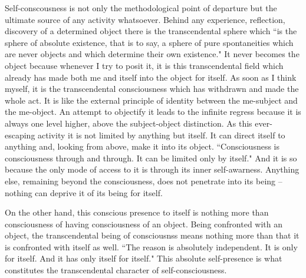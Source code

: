 Self-conscousness is not only the methodological point of departure but the ultimate source of any activity 
whatsoever. Behind any experience, reflection, discovery of a determined object there is the transcendental sphere 
which ``is the sphere of absolute existence, that is to say, a sphere of pure spontaneities which are never objects 
and which determine their own existence." \cite{ToE} It never becomes the object because whenever I try to posit it, it is 
this transcendental field which already has made both me and itself into the object for itself. As soon as I think 
myself, it is the transcendental consciousness which has withdrawn and made the whole act. It is like the external 
principle of identity between the me-subject and the me-object. An attempt to objectify it leads to the infinite 
regress because it is always one level higher, above the subject-object distinction. As this ever-escaping activity it 
is not limited by anything but itself. It can direct itself to anything and, looking from above, make it into its 
object. ``Consciousness is consciousness through and through. It can be limited only by itself." \cite{BN}    And it is so 
because the only mode of access to it is through its inner self-awarness. Anything else, remaining beyond the 
consciousness, does not penetrate into its being -- nothing can deprive it of its being for itself.

On the other hand, this conscious presence to itself is nothing more than consciousness of having consciousness 
of an object. Being confronted with an object, the transcendental being of consciousnss means nothing more than 
that it is confronted with itself as well. ``The reason is absolutely independent. It is only for itself. And it has only 
itself for itself." \cite{ITS} This absolute self-presence is what constitutes the transcendental character of self-consciousness. 

